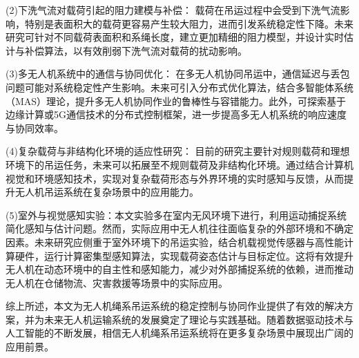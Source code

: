 \documentclass[lang=chs, degree=master, blindreview=false, winfonts=true]{yanputhesis}
\begin{document}
(2)下洗气流对载荷引起的阻力建模与补偿：
载荷在吊运过程中会受到下洗气流影响，特别是表面积大的载荷更容易产生较大阻力，进而引发系统稳定性下降。未来研究可针对不同载荷表面积和系绳长度，建立更加精细的阻力模型，并设计实时估计与补偿算法，以有效削弱下洗气流对载荷的扰动影响。

(3)多无人机系统中的通信与协同优化：
在多无人机协同吊运中，通信延迟与丢包问题可能对系统稳定性产生影响。未来可引入分布式优化算法，结合多智能体系统（MAS）理论，提升多无人机协同作业的鲁棒性与容错能力。此外，可探索基于边缘计算或5G通信技术的分布式控制框架，进一步提高多无人机系统的响应速度与协同效率。

(4)复杂载荷与非结构化环境的适应性研究：
目前的研究主要针对规则载荷和理想环境下的吊运任务，未来可以拓展至不规则载荷及非结构化环境。通过结合计算机视觉和环境感知技术，实现对复杂载荷形态与外界环境的实时感知与反馈，从而提升无人机吊运系统在复杂场景中的应用能力。

(5)室外与视觉感知实验：本文实验多在室内无风环境下进行，利用运动捕捉系统简化感知与估计问题。然而，实际应用中无人机往往面临复杂的外部环境和不确定因素。未来研究应侧重于室外环境下的吊运实验，结合机载视觉传感器与高性能计算硬件，运行计算密集型感知算法，实现载荷姿态估计与目标定位。这将有效提升无人机在动态环境中的自主性和感知能力，减少对外部捕捉系统的依赖，进而推动无人机在仓储物流、灾害救援等场景中的实际应用。

综上所述，本文为无人机绳系吊运系统的稳定控制与协同作业提供了有效的解决方案，并为未来无人机运输系统的发展奠定了理论与实践基础。随着数据驱动技术与人工智能的不断发展，相信无人机绳系吊运系统将在更多复杂场景中展现出广阔的应用前景。





\backmatter                                                 %
%
\end{document}
